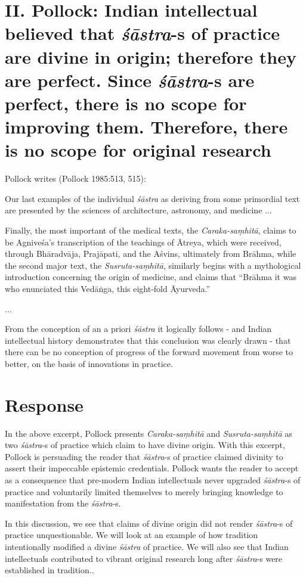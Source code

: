 \section*{II. Pollock: Indian intellectual believed that {\sl śāstra}-s of practice are divine in origin; therefore they are perfect. Since {\sl śāstra}-s are perfect, there is no scope for improving them. Therefore, there is no scope for original research}

Pollock writes (Pollock 1985:513, 515):
\begin{myquote}
Our last examples of the individual {\sl śāstra} as deriving from some primordial text are presented by the sciences of architecture, astronomy, and medicine ...

Finally, the most important of the medical texts, the {\sl Caraka-saṃhitā}, claims to be Agniveśa's transcription of the teachings of Ātreya, which were received, through Bhāradvāja, Prajāpati, and the Aśvins, ultimately from Brāhma, while the second major text, the {\sl Susruta-saṃhitā}, similarly begins with a mythological introduction concerning the origin of medicine, and claims that ``Brāhma it was who enunciated this Vedāṅga, this eight-fold Āyurveda.''

...

From the conception of an a priori {\sl śāstra} it logically follows - and Indian intellectual history demonstrates that this conclusion was clearly drawn - that there can be no conception of progress of the forward movement from worse to better, on the basis of innovations in practice. 
\end{myquote}

\section*{Response}

In the above excerpt, Pollock presents {\sl Caraka-saṃhitā} and {\sl Susruta-saṃhitā} as two {\sl śāstra}-s of practice which claim to have divine origin.  With this excerpt, Pollock is persuading the reader that {\sl śāstra}-s of practice claimed divinity to assert their impeccable epistemic credentials. Pollock wants the reader to accept as a consequence that pre-modern Indian intellectuals never upgraded {\sl śāstra}-s of practice and voluntarily limited themselves to merely bringing knowledge to manifestation from the {\sl śāstra}-s.

In this discussion, we see that claims of divine origin did not render {\sl śāstra}-s of practice unquestionable. We will look at an example of how tradition intentionally modified a divine {\sl śāstra} of practice. We will also see that Indian intellectuals contributed to vibrant original research long after {\sl śāstra}-s were established in tradition..

